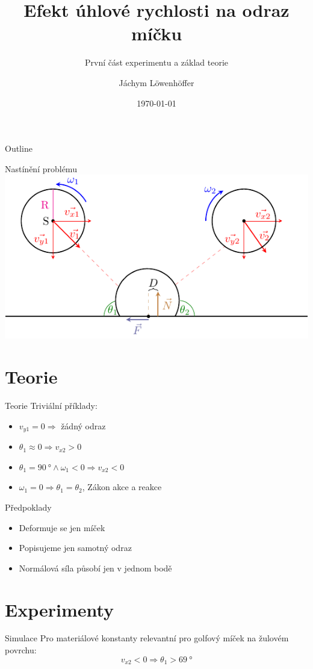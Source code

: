 \documentclass{beamer}
\title{Efekt úhlové rychlosti na odraz míčku}
\subtitle{První část experimentu a základ teorie}
\author{Jáchym Löwenhöffer}
\institute{GEVO JM}
\date{\today}
\begin{document}
 
 \begin{frame}
  \titlepage
 \end{frame}

 \begin{frame}{Outline}
  \tableofcontents
 \end{frame}

 \begin{frame}{Nastínění problému}
  \includegraphics{diagram.pdf}
 \end{frame}

 \section{Teorie} 

\begin{frame}
 \sectionpage
\end{frame}

 \begin{frame}{Teorie}
  Triviální příklady:
  \begin{itemize}
   \item $v_{y1}=0 \Rightarrow $ žádný odraz
   \item $\theta_1\approx0 \Rightarrow v_{x2} > 0$
   \item $\theta_1=\qty{90}{\degree} \land \omega_1<0 \Rightarrow v_{x2} < 0 $
   \item $\omega_1=0 \Rightarrow \theta_1=\theta_2 $, Zákon akce a reakce
  \end{itemize}
 \end{frame}

 \begin{frame}{Předpoklady}
 \begin{itemize}
  \item Deformuje se jen míček
  \item Popisujeme jen samotný odraz
  \item Normálová síla působí jen v jednom bodě
 \end{itemize}
\end{frame}

\section{Experimenty}
\begin{frame}
 \sectionpage
\end{frame}

 \begin{frame}{Simulace}
 Pro materiálové konstanty relevantní pro golfový míček na žulovém povrchu:
 \[
  v_{x2} < 0 \Rightarrow \theta_1 > \qty{69}{\degree}
 \]
\end{frame}
\end{document}
